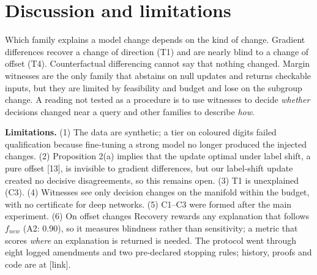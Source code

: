 \documentclass{esannV2}
\begin{document}
\section{Discussion and limitations}

Which family explains a model change depends on the kind of change. Gradient differences recover a change of direction (T1) and are nearly blind to a change of offset (T4). Counterfactual differencing cannot say that nothing changed. Margin witnesses are the only family that abstains on null updates and returns checkable inputs, but they are limited by feasibility and budget and lose on the subgroup change. A reading not tested as a procedure is to use witnesses to decide \emph{whether} decisions changed near a query and other families to describe \emph{how}.

\textbf{Limitations.} (1) The data are synthetic; a tier on coloured digits failed qualification because fine-tuning a strong model no longer produced the injected changes. (2) Proposition 2(a) implies that the update optimal under label shift, a pure offset [13], is invisible to gradient differences, but our label-shift update created no decisive disagreements, so this remains open. (3) T1 is unexplained (C3). (4) Witnesses see only decision changes on the manifold within the budget, with no certificate for deep networks. (5) C1--C3 were formed after the main experiment. (6) On offset changes Recovery rewards any explanation that follows $f_{new}$ (A2: 0.90), so it measures blindness rather than sensitivity; a metric that scores \emph{where} an explanation is returned is needed. The protocol went through eight logged amendments and two pre-declared stopping rules; history, proofs and code are at [link].
\end{document}
